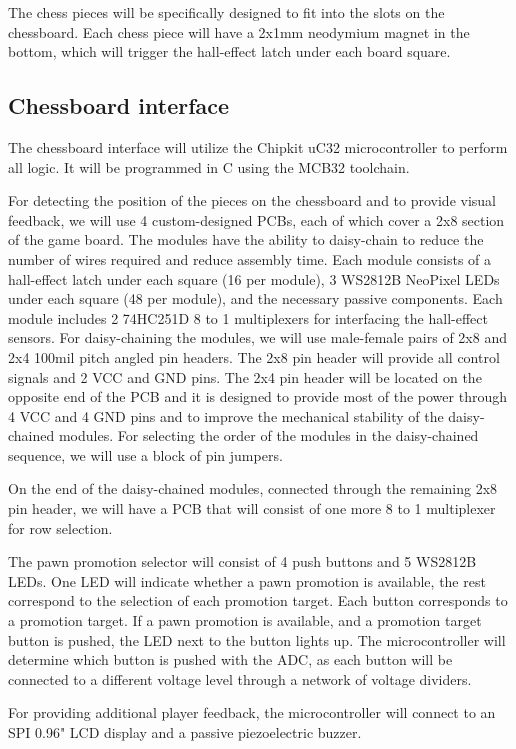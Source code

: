 \documentclass{article}
\begin{document}
The chess pieces will be specifically designed to fit into the slots on the chessboard. Each chess piece will have a 2x1mm neodymium magnet in the bottom, which will trigger the hall-effect latch under each board square.

\subsection*{Chessboard interface}

The chessboard interface will utilize the Chipkit uC32 microcontroller to perform all logic. It will be programmed in C using the MCB32 toolchain.

For detecting the position of the pieces on the chessboard and to provide visual feedback, we will use 4 custom-designed PCBs, each of which cover a 2x8 section of the game board. The modules have the ability to daisy-chain to reduce the number of wires required and reduce assembly time. Each module consists of a hall-effect latch under each square (16 per module), 3 WS2812B NeoPixel LEDs under each square (48 per module), and the necessary passive components. Each module includes 2 74HC251D 8 to 1 multiplexers for interfacing the hall-effect sensors. For daisy-chaining the modules, we will use male-female pairs of 2x8 and 2x4 100mil pitch angled pin headers. The 2x8 pin header will provide all control signals and 2 VCC and GND pins. The 2x4 pin header will be located on the opposite end of the PCB and it is designed to provide most of the power through 4 VCC and 4 GND pins and to improve the mechanical stability of the daisy-chained modules. For selecting the order of the modules in the daisy-chained sequence, we will use a block of pin jumpers.

On the end of the daisy-chained modules, connected through the remaining 2x8 pin header, we will have a PCB that will consist of one more 8 to 1 multiplexer for row selection.

The pawn promotion selector will consist of 4 push buttons and 5 WS2812B LEDs. One LED will indicate whether a pawn promotion is available, the rest correspond to the selection of each promotion target. Each button corresponds to a promotion target. If a pawn promotion is available, and a promotion target button is pushed, the LED next to the button lights up. The microcontroller will determine which button is pushed with the ADC, as each button will be connected to a different voltage level through a network of voltage dividers.

For providing additional player feedback, the microcontroller will connect to an SPI 0.96" LCD display and a passive piezoelectric buzzer.
\end{document}
